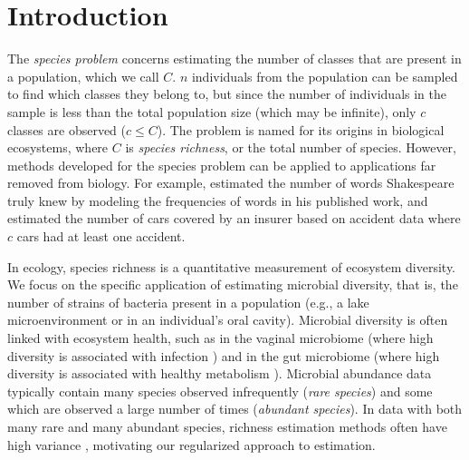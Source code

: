 \documentclass[12pt]{article}
\theoremstyle{break}
\theoremstyle{break}
\begin{document}
%
%
%



\section{Introduction}
\label{sec:introduction}

The \textit{species problem} concerns estimating the number of classes that are present in a population, which we call $C$.
$n$ individuals from the population can be sampled to find which classes they belong to, but since the  number of individuals in the sample is less than the total population size (which may be infinite), only $c$ classes are observed ($c \leq C$). The problem is named for its origins in biological ecosystems, where $C$ is \textit{species richness}, or the total number of species.  However, methods developed for the species problem can be applied to applications far removed from biology.  For example, \citet{efron_1976} estimated the number of words Shakespeare truly knew by modeling the frequencies of words in his published work, and  \citet{fegatelli_2018} estimated the number of cars covered by an insurer based on accident data where $c$ cars had at least one accident.

In ecology, species richness is a quantitative measurement of ecosystem diversity.  We focus on the specific application of estimating microbial diversity, that is, the number of strains of bacteria present in a population (e.g., a lake microenvironment or in an individual's oral cavity).
Microbial diversity is often linked with ecosystem health, such as in the vaginal microbiome (where high diversity is associated with infection \citep{Oakley:2008uo}) and in the gut microbiome (where high diversity is associated with healthy metabolism \citep{Morgan:2012bm,Minot:2019hc}).
Microbial abundance data typically contain many species observed infrequently (\textit{rare species}) and some which are observed a large number of times (\textit{abundant species}).  In data with both many rare and many abundant species, richness estimation methods often have high variance \citep{wang_2005,willis_2015}, motivating our regularized approach to estimation.
\end{document}

